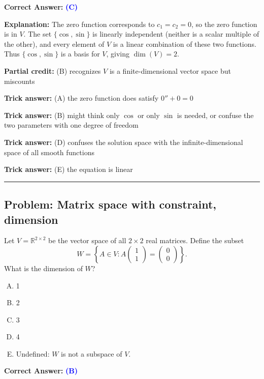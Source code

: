 \documentclass[12pt]{amsart}
\newcommand{\divider}{
  \vspace{-1em}
  \noindent
  \raisebox{-0.15ex}{\textbullet}%
  \hspace{0.5em}%
  \rule[0.5ex]{0.95\textwidth}{1.0pt}%
  \hspace{0.5em}%
  \raisebox{-0.15ex}{\textbullet}%
  \vspace{0em}
}
\begin{document}
\textbf{Correct Answer:} \textcolor{blue}{\textbf{(C)}}

\textbf{Explanation:} The zero function corresponds to $c_1 = c_2 = 0$, so the zero function is in $V$. The set $\{\cos, \sin\}$ is linearly independent (neither is a scalar multiple of the other), and every element of $V$ is a linear combination of these two functions. Thus $\{\cos, \sin\}$ is a basis for $V$, giving $\dim(V) = 2$.

\textbf{Partial credit:} (B) recognizes $V$ is a finite-dimensional vector space but miscounts

\textbf{Trick answer:} (A) the zero function does satisfy $0'' + 0 = 0$

\textbf{Trick answer:} (B) might think only $\cos$ or only $\sin$ is needed, or confuse the two parameters with one degree of freedom

\textbf{Trick answer:} (D) confuses the solution space with the infinite-dimensional space of all smooth functions

\textbf{Trick answer:} (E) the equation is linear

\divider

\subsection*{Problem: Matrix space with constraint, dimension}

Let $V = \mathbb{R}^{2 \times 2}$ be the vector space of all $2 \times 2$ real matrices. Define the subset 
$$W = \left\{ A \in V : A \begin{pmatrix} 1 \\ 1 \end{pmatrix} = \begin{pmatrix} 0 \\ 0 \end{pmatrix} \right\}.$$
What is the dimension of $W$?

\begin{enumerate}[(A)]
\item 1
\item 2
\item 3
\item 4
\item Undefined: $W$ is not a subspace of $V$.
\end{enumerate}

\textbf{Correct Answer:} \textcolor{blue}{\textbf{(B)}}
\end{document}
